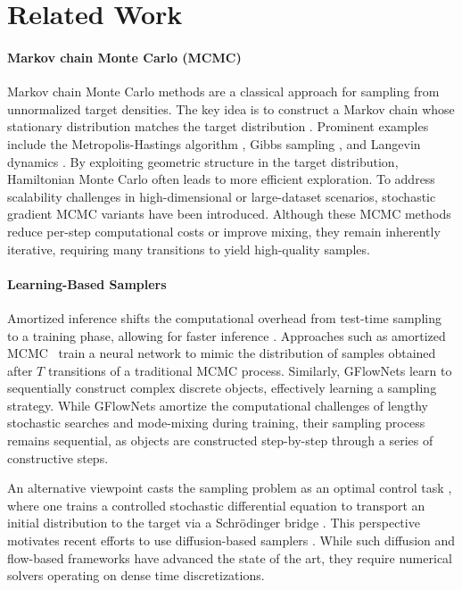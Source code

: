\section{Related Work}
\label{sec:related-work}
\paragraph{Markov chain Monte Carlo (MCMC)}
Markov chain Monte Carlo methods are a classical approach for sampling from unnormalized target densities. 
The key idea is to construct a Markov chain whose stationary distribution matches the target distribution \citep{brooks2012handbookmcmc}. 
Prominent examples include the Metropolis-Hastings algorithm \citep{metropolis1953equation, hastings1970monte}, Gibbs sampling \citep{geman1984gibbs}, and Langevin dynamics \citep{rossky1978langevin, parisi1981langevin}. 
By exploiting geometric structure in the target distribution, Hamiltonian Monte Carlo \citep{duance1987hmc, mackay2003mcmcbook, brooks2012handbookmcmc, chen2014stochastic} often leads to more efficient exploration. 
To address scalability challenges in high-dimensional or large-dataset scenarios, stochastic gradient MCMC variants \citep{welling2011langevin, chen2014stochastic, zhang2020amagold, zhang2019cyclical} have been introduced. 
Although these MCMC methods reduce per-step computational costs or improve mixing, they remain inherently iterative, requiring many transitions to yield high-quality samples.

\paragraph{Learning-Based Samplers}
Amortized inference shifts the computational overhead from test-time sampling to a training phase, allowing for faster inference \citep{gershman2014amortized}. 
Approaches such as amortized MCMC~\citep{li2017amortizedmcmc} train a neural network to mimic the distribution of samples obtained after $T$ transitions of a traditional MCMC process. 
Similarly, GFlowNets \citep{bengio2021gflownets, bengio2023foundations} learn to sequentially construct complex discrete objects, effectively learning a sampling strategy. 
While GFlowNets amortize the computational challenges of lengthy stochastic searches and mode-mixing
during training, their sampling process remains sequential, as objects are constructed step-by-step
through a series of constructive steps.

An alternative viewpoint casts the sampling problem as an optimal control task \citep{zhang2022pis, berner2024dis, richter2024improved}, where one trains a controlled stochastic differential equation to transport an initial distribution to the target via a Schrödinger bridge \citep{schrodinger1931umkehrung, schrodinger1932relativiste}. 
This perspective motivates recent efforts to use diffusion-based samplers \citep{geffner2023langevin, vargas2023dds, zhang2024dgfs, phillips2024particle, chen2025SCLD}. 
While such diffusion and flow-based frameworks have advanced the state of the art, they require numerical solvers operating on dense time discretizations.

